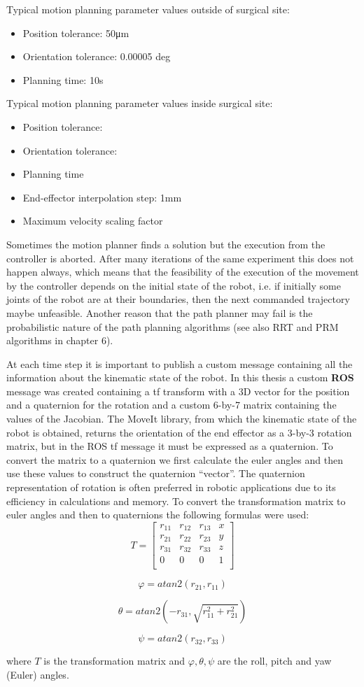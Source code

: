 Typical motion planning parameter values outside of surgical site:
\begin{itemize}
	\item Position tolerance: 50μm
	\item Orientation tolerance: 0.00005 deg
	\item Planning time: 10s
\end{itemize}

Typical motion planning parameter values inside surgical site:
\begin{itemize}
	\item Position tolerance:
	\item Orientation tolerance:
	\item Planning time
	\item End-effector interpolation step: 1mm
	\item Maximum velocity scaling factor
\end{itemize}

Sometimes the motion planner finds a solution but the execution from the controller is aborted. 
After many iterations of the same experiment this does not happen always, which means that the 
feasibility of the execution of the movement by the controller depends on the initial state of 
the robot, i.e. if initially some joints of the robot are at their boundaries, then the next 
commanded trajectory maybe unfeasible. Another reason that the path planner may fail is the 
probabilistic nature of the path planning algorithms (see also RRT and PRM algorithms in chapter 6).

At each time step it is important to publish a custom message containing all the information 
about the kinematic state of the robot. In this thesis a custom \textbf{ROS} message was created 
containing a tf transform with a 3D vector for the position and a quaternion for the rotation and 
a custom  6-by-7 matrix containing the values of the Jacobian. The MoveIt library, from which the 
kinematic state of the robot is obtained, returns the orientation of the end effector as a 3-by-3 
rotation matrix, but in the ROS tf message it must be expressed as a quaternion. To convert the 
matrix to a quaternion we first calculate the euler angles and then use these values to construct 
the quaternion “vector”. The quaternion representation of rotation is often preferred in robotic 
applications due to its efficiency in calculations and memory. To convert the transformation 
matrix to euler angles and then to quaternions the following formulas were used:
\[
T = 
\begin{bmatrix}
r_{11} & r_{12} & r_{13} & x \\
r_{21} & r_{22} & r_{23} & y \\
r_{31} & r_{32} & r_{33} & z \\
0 & 0 & 0 & 1\\
\end{bmatrix}
\]

\[
φ = atan2(r_{21}, r_{11})
\]

\[
θ = atan2(-r_{31}, \sqrt{r_{11}^2 + r_{21}^2})
\]

\[
ψ = atan2(r_{32}, r_{33})
\]

where $T$ is the transformation matrix and $φ, θ, ψ$ are the roll, pitch and yaw (Euler) angles.
